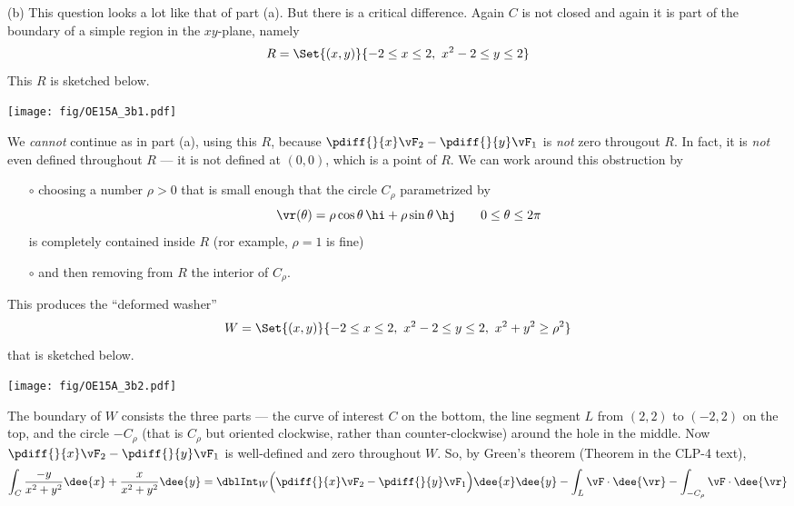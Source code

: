 \begin{solution}
(b) This question looks a lot like that of part (a). But there is
a critical difference. Again $C$ is not closed and again it is
part of the boundary of a simple region in the $xy$-plane, namely
\begin{equation*}
R = \Set{(x,y)}{-2\le x\le 2,\ x^2-2\le y\le 2}
\end{equation*}
This $R$ is sketched below.
 \begin{center}
    \texttt{[image: fig/OE15A\_3b1.pdf]}
\end{center}
We \emph{cannot} continue as in part (a), using this $R$, because
$\pdiff{}{x} \vF_2 -
\pdiff{}{y} \vF_1 $ is \emph{not} zero througout $R$.
In fact, it is \emph{not} even defined throughout $R$ --- it is not defined
at $(0,0)$, which is a point of $R$. We can work around this obstruction
by
\begin{itemize}\itemsep1pt \parskip0pt  %
\item[$\circ$]
choosing a number $\rho>0$ that is small enough that the circle
$C_\rho$ parametrized by
\begin{equation*}
\vr(\theta) = \rho\cos\theta\,\hi +\rho\sin\theta\,\hj\qquad
0\le \theta \le 2\pi
\end{equation*}
is completely contained inside $R$ (ror example, $\rho=1$ is fine)
\item[$\circ$]
and then removing from $R$ the interior of $C_\rho$.
\end{itemize}
This produces the ``deformed washer''
\begin{equation*}
W = \Set{(x,y)}{-2\le x\le 2,\ x^2-2\le y\le 2,\ x^2+y^2\ge\rho^2}
\end{equation*}
that is sketched below.
 \begin{center}
    \texttt{[image: fig/OE15A\_3b2.pdf]}
\end{center}
The boundary of $W$ consists the three parts ---
 the curve of interest $C$ on the bottom,
 the line segment $L$ from $(2,2)$ to $(-2,2)$ on the top,
 and the circle $-C_\rho$ (that is $C_\rho$ but oriented clockwise,
 rather than counter-clockwise) around the hole in the middle. Now
$\pdiff{}{x} \vF_2 -
\pdiff{}{y} \vF_1 $
is well-defined and zero throughout $W$. So, by Green's theorem
(Theorem  in the CLP-4 text),
\begin{align*}
\int_C \frac{-y}{x^2+y^2}\dee{x} + \frac{x}{x^2+y^2}\dee{y}
&=\dblInt_W \Big(\pdiff{}{x} \vF_2 -
          \pdiff{}{y} \vF_1 \Big)\dee{x}\dee{y}
 - \int_L\vF\cdot\dee{\vr}- \int_{-C_\rho}\vF\cdot\dee{\vr} \\

\end{align*}
\end{solution}
